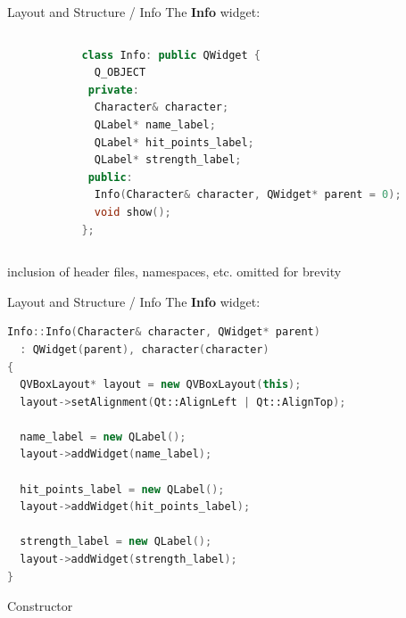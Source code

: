 \documentclass[11pt]{beamer}
\renewcommand{\emph}[1]{\textbf{#1}}
\begin{document}
\begin{frame}[fragile]{Layout and Structure / Info}
 The \emph{Info} widget:
 \begin{columns}
  \begin{column}{0.33\textwidth}
  \end{column}
  \begin{column}{0.66\textwidth}
   \begin{lstlisting}[language=C++]
class Info: public QWidget {
  Q_OBJECT
 private:
  Character& character;
  QLabel* name_label;
  QLabel* hit_points_label;
  QLabel* strength_label;
 public:
  Info(Character& character, QWidget* parent = 0);
  void show();
};\end{lstlisting}
  \end{column}
 \end{columns}
 {\footnotesize inclusion of header files, namespaces, etc. omitted for brevity}
\end{frame}

\begin{frame}[fragile]{Layout and Structure / Info}
 The \emph{Info} widget:
 \begin{lstlisting}[language=C++]
Info::Info(Character& character, QWidget* parent)
  : QWidget(parent), character(character)
{
  QVBoxLayout* layout = new QVBoxLayout(this);
  layout->setAlignment(Qt::AlignLeft | Qt::AlignTop);
    
  name_label = new QLabel();
  layout->addWidget(name_label);
    
  hit_points_label = new QLabel();
  layout->addWidget(hit_points_label);
    
  strength_label = new QLabel();
  layout->addWidget(strength_label);
}
\end{lstlisting}
 {\footnotesize Constructor}
\end{frame}
\end{document}
